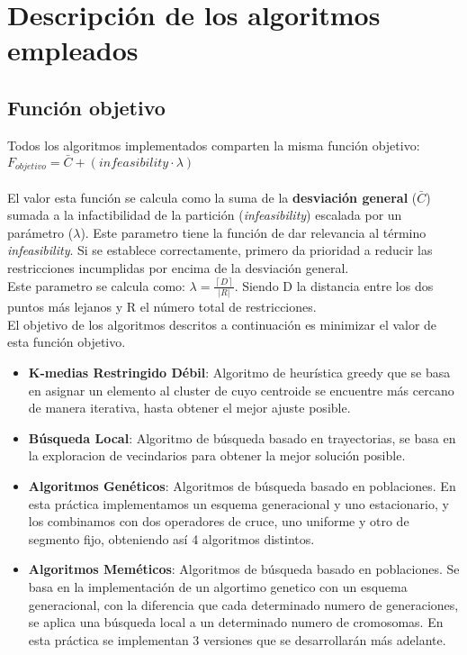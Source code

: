 \chapter{Descripción de los algoritmos empleados}
\section{Función objetivo}

Todos los algoritmos implementados comparten la misma función objetivo: $ F_{objetivo} = \bar{C} + (infeasibility \cdot \lambda) $\\
\\
El valor esta función se calcula como la suma de la \textbf{desviación general} ($ \bar{C} $) sumada a la infactibilidad de la partición (\emph{infeasibility}) escalada por un parámetro ($ \lambda $). Este parametro tiene la función de dar relevancia al término \emph{infeasibility}. Si se establece correctamente, primero da prioridad a reducir las restricciones incumplidas por encima de la desviación general.\\ Este parametro se calcula como: $ \lambda = \frac{\left \lceil D \right \rceil}{\left | R \right |}$. Siendo D la distancia entre los dos puntos más lejanos y R el número total de restricciones. \\
El objetivo de los algoritmos descritos a continuación es minimizar el valor de esta función objetivo.

\begin{itemize}
   \item \textbf{K-medias Restringido Débil}: Algoritmo de heurística greedy que se basa en asignar un elemento al cluster de cuyo centroide se encuentre más cercano de manera iterativa, hasta obtener el mejor ajuste posible.
   \item \textbf{Búsqueda Local}: Algoritmo de búsqueda basado en trayectorias, se basa en la exploracion de vecindarios para obtener la mejor solución posible.
   \item \textbf{Algoritmos Genéticos}: Algoritmos de búsqueda basado en poblaciones. En esta práctica implementamos un esquema generacional y uno estacionario, y los combinamos con dos operadores de cruce, uno uniforme y otro de segmento fijo, obteniendo así 4 algoritmos distintos.
   \item \textbf{Algoritmos Meméticos}: Algoritmos de búsqueda basado en poblaciones. Se basa en la implementación de un algortimo genetico con un esquema generacional, con la diferencia que cada determinado numero de generaciones, se aplica una búsqueda local a un determinado numero de cromosomas. En esta práctica se implementan 3 versiones que se desarrollarán más adelante.

\end{itemize}

